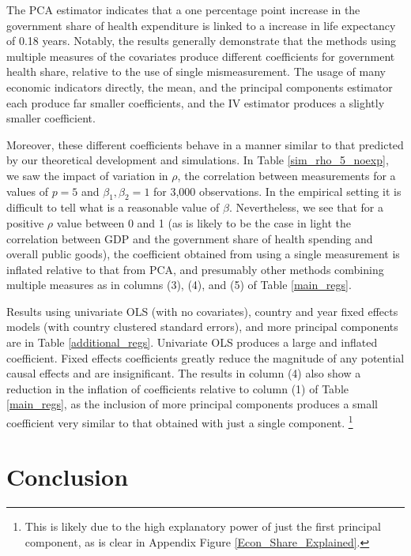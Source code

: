 \documentclass[10pt]{article}
\begin{document}
        

        The PCA estimator indicates that a one percentage point increase in the government share of health expenditure is linked to a increase in life expectancy of 0.18 years. Notably, the results generally demonstrate that the methods using multiple measures of the covariates produce different coefficients for government health share, relative to the use of single mismeasurement. The usage of many economic indicators directly, the mean, and the principal components estimator each produce far smaller coefficients, and the IV estimator produces a slightly smaller coefficient.

        Moreover, these different coefficients behave in a manner similar to that predicted by our theoretical development and simulations. In Table \ref{sim_rho_5_noexp}, we saw the impact of variation in $\rho$, the correlation between measurements for a values of $p = 5$ and $\beta_1, \beta_2 = 1$ for 3,000 observations. In the empirical setting it is difficult to tell what is a reasonable value of $\beta$. Nevertheless, we see that for a positive $\rho$ value between 0 and 1 (as is likely to be the case in light the correlation between GDP and the government share of health spending and overall public goods), the coefficient obtained from using a single measurement is inflated relative to that from PCA, and presumably other methods combining multiple measures as in columns (3), (4), and (5) of Table \ref{main_regs}.

        Results using univariate OLS (with no covariates), country and year fixed effects models (with country clustered standard errors), and more principal components are in Table \ref{additional_regs}. Univariate OLS produces a large and inflated coefficient. Fixed effects coefficients greatly reduce the magnitude of any potential causal effects and are insignificant. The results in column (4) also show a reduction in the inflation of coefficients relative to column (1) of Table \ref{main_regs}, as the inclusion of more principal components produces a small coefficient very similar to that obtained with just a single component. \footnote{This is likely due to the high explanatory power of just the first principal component, as is clear in Appendix Figure \ref{Econ_Share_Explained}.}

        

    \section*{Conclusion}
        
\end{document}
